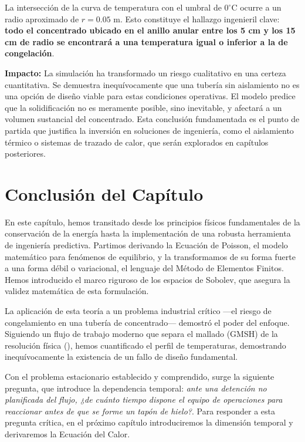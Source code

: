La intersección de la curva de temperatura con el umbral de \(0^\circ\text{C}\) ocurre a un radio aproximado de \(r=0.05\) m. Esto constituye el hallazgo ingenieril clave: \textbf{todo el concentrado ubicado en el anillo anular entre los 5 cm y los 15 cm de radio se encontrará a una temperatura igual o inferior a la de congelación}.

\textbf{Impacto:} La simulación ha transformado un riesgo cualitativo en una certeza cuantitativa. Se demuestra inequívocamente que una tubería sin aislamiento no es una opción de diseño viable para estas condiciones operativas. El modelo predice que la solidificación no es meramente posible, sino inevitable, y afectará a un volumen sustancial del concentrado. Esta conclusión fundamentada es el punto de partida que justifica la inversión en soluciones de ingeniería, como el aislamiento térmico o sistemas de trazado de calor, que serán explorados en capítulos posteriores.

\section*{Conclusión del Capítulo}

En este capítulo, hemos transitado desde los principios físicos fundamentales de la conservación de la energía hasta la implementación de una robusta herramienta de ingeniería predictiva. Partimos derivando la Ecuación de Poisson, el modelo matemático para fenómenos de equilibrio, y la transformamos de su forma fuerte a una forma débil o variacional, el lenguaje del Método de Elementos Finitos. Hemos introducido el marco riguroso de los espacios de Sobolev, que asegura la validez matemática de esta formulación.

La aplicación de esta teoría a un problema industrial crítico ---el riesgo de congelamiento en una tubería de concentrado--- demostró el poder del enfoque. Siguiendo un flujo de trabajo moderno que separa el mallado (GMSH) de la resolución física (\fenics), hemos cuantificado el perfil de temperaturas, demostrando inequívocamente la existencia de un fallo de diseño fundamental.

Con el problema estacionario establecido y comprendido, surge la siguiente pregunta, que introduce la dependencia temporal: \textit{ante una detención no planificada del flujo, ¿de cuánto tiempo dispone el equipo de operaciones para reaccionar antes de que se forme un tapón de hielo?}. Para responder a esta pregunta crítica, en el próximo capítulo introduciremos la dimensión temporal y derivaremos la Ecuación del Calor.